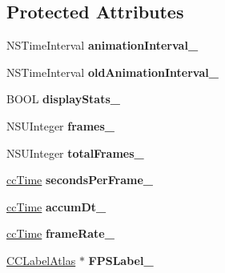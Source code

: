 \subsection*{Protected Attributes}
\begin{DoxyCompactItemize}
\item 
\hypertarget{class_c_c_director_a5a1668e16cb661fcab9f385f64e829b2}{N\-S\-Time\-Interval {\bfseries animation\-Interval\-\_\-}}\label{class_c_c_director_a5a1668e16cb661fcab9f385f64e829b2}

\item 
\hypertarget{class_c_c_director_a3176280f498988fa4dff8a7d6e0eb837}{N\-S\-Time\-Interval {\bfseries old\-Animation\-Interval\-\_\-}}\label{class_c_c_director_a3176280f498988fa4dff8a7d6e0eb837}

\item 
\hypertarget{class_c_c_director_a7f72cd983b36ad2074dd89930de9699e}{B\-O\-O\-L {\bfseries display\-Stats\-\_\-}}\label{class_c_c_director_a7f72cd983b36ad2074dd89930de9699e}

\item 
\hypertarget{class_c_c_director_acd75d964325cfd626855299d6f7444a3}{N\-S\-U\-Integer {\bfseries frames\-\_\-}}\label{class_c_c_director_acd75d964325cfd626855299d6f7444a3}

\item 
\hypertarget{class_c_c_director_a4ae4467bd8d0e70091b5414e8652edb0}{N\-S\-U\-Integer {\bfseries total\-Frames\-\_\-}}\label{class_c_c_director_a4ae4467bd8d0e70091b5414e8652edb0}

\item 
\hypertarget{class_c_c_director_a5449182bab5080a8d2afb9a4cb2f2295}{\hyperlink{cc_types_8h_ae6c674aac4bfb46a4e6cb1e89bb66b4f}{cc\-Time} {\bfseries seconds\-Per\-Frame\-\_\-}}\label{class_c_c_director_a5449182bab5080a8d2afb9a4cb2f2295}

\item 
\hypertarget{class_c_c_director_a69884dc233926dffcc65e1599b1868e9}{\hyperlink{cc_types_8h_ae6c674aac4bfb46a4e6cb1e89bb66b4f}{cc\-Time} {\bfseries accum\-Dt\-\_\-}}\label{class_c_c_director_a69884dc233926dffcc65e1599b1868e9}

\item 
\hypertarget{class_c_c_director_a37e49146c00ac7b838ac29cd7483049a}{\hyperlink{cc_types_8h_ae6c674aac4bfb46a4e6cb1e89bb66b4f}{cc\-Time} {\bfseries frame\-Rate\-\_\-}}\label{class_c_c_director_a37e49146c00ac7b838ac29cd7483049a}

\item 
\hypertarget{class_c_c_director_ae04eed9a2ab221fa70ea98eaf4cfc2ea}{\hyperlink{interface_c_c_label_atlas}{C\-C\-Label\-Atlas} $\ast$ {\bfseries F\-P\-S\-Label\-\_\-}}\label{class_c_c_director_ae04eed9a2ab221fa70ea98eaf4cfc2ea}


\end{DoxyCompactItemize}
